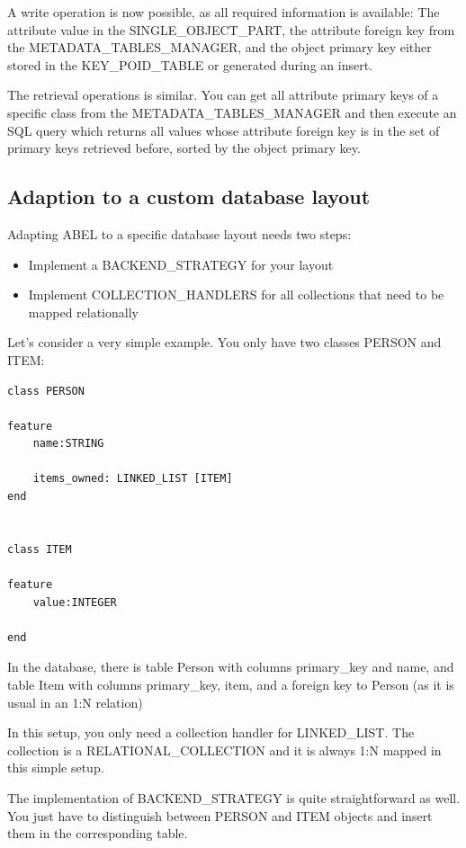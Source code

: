 A write operation is now possible, as all required information is available: 
The attribute value in the SINGLE\_OBJECT\_PART, the attribute foreign key from the METADATA\_TABLES\_MANAGER, and the object primary key either stored in the KEY\_POID\_TABLE or generated during an insert.

The retrieval operations is similar.
You can get all attribute primary keys of a specific class from the METADATA\_TABLES\_MANAGER and then execute an SQL query which returns all values whose attribute foreign key is in the set of primary keys retrieved before, sorted by the object primary key.


\subsection{Adaption to a custom database layout}
\label{subsection:specific_adaption}

Adapting ABEL to a specific database layout needs two steps:
 \begin{itemize}
  \item Implement a BACKEND\_STRATEGY for your layout
  \item Implement COLLECTION\_HANDLERS for all collections that need to be mapped relationally
 \end{itemize}

Let's consider a very simple example. You only have two classes PERSON and ITEM:

\begin{lstlisting}[language=OOSC2Eiffel, captionpos=b, caption={Application classes}, label={lst:example_application}]
class PERSON

feature
	name:STRING

	items_owned: LINKED_LIST [ITEM]
end


class ITEM

feature
	value:INTEGER

end
\end{lstlisting}

In the database, there is table Person with columns primary\_key and name, and table Item with columns primary\_key, item, and a foreign key to Person (as it is usual in an 1:N relation)

In this setup, you only need a collection handler for LINKED\_LIST.
The collection is a RELATIONAL\_COLLECTION and it is always 1:N mapped in this simple setup.

The implementation of BACKEND\_STRATEGY is quite straightforward as well.
You just have to distinguish between PERSON and ITEM objects and insert them in the corresponding table.

